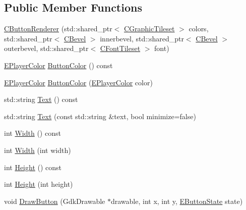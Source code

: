 \subsection*{Public Member Functions}
\begin{DoxyCompactItemize}
\item 
\hyperlink{classCButtonRenderer_a168e60a1e237820d58b4667003340aaf}{C\+Button\+Renderer} (std\+::shared\+\_\+ptr$<$ \hyperlink{classCGraphicTileset}{C\+Graphic\+Tileset} $>$ colors, std\+::shared\+\_\+ptr$<$ \hyperlink{classCBevel}{C\+Bevel} $>$ innerbevel, std\+::shared\+\_\+ptr$<$ \hyperlink{classCBevel}{C\+Bevel} $>$ outerbevel, std\+::shared\+\_\+ptr$<$ \hyperlink{classCFontTileset}{C\+Font\+Tileset} $>$ font)
\item 
\hyperlink{GameDataTypes_8h_aafb0ca75933357ff28a6d7efbdd7602f}{E\+Player\+Color} \hyperlink{classCButtonRenderer_a1b7adb2d7ced22c309cb497ea5e8d10c}{Button\+Color} () const
\item 
\hyperlink{GameDataTypes_8h_aafb0ca75933357ff28a6d7efbdd7602f}{E\+Player\+Color} \hyperlink{classCButtonRenderer_a76037d44fb1da753bcd1447a44dba51c}{Button\+Color} (\hyperlink{GameDataTypes_8h_aafb0ca75933357ff28a6d7efbdd7602f}{E\+Player\+Color} color)
\item 
std\+::string \hyperlink{classCButtonRenderer_ab0ff6bd90e3f7f7a9946c5c3198ed30c}{Text} () const
\item 
std\+::string \hyperlink{classCButtonRenderer_a565c9c19612bc2c7fb29a22f18b74d13}{Text} (const std\+::string \&text, bool minimize=false)
\item 
int \hyperlink{classCButtonRenderer_a9da3b741cb517d2386dd265ad494af54}{Width} () const
\item 
int \hyperlink{classCButtonRenderer_ace9959d559850f1b916e1a949f25e21f}{Width} (int width)
\item 
int \hyperlink{classCButtonRenderer_aecdea7c8978a3d0fb27f3a7bf49d8387}{Height} () const
\item 
int \hyperlink{classCButtonRenderer_addba56a5d490f33010c919020e67a376}{Height} (int height)
\item 
void \hyperlink{classCButtonRenderer_a9f29dd6d2243ddae58211706cc6b37b6}{Draw\+Button} (Gdk\+Drawable $\ast$drawable, int x, int y, \hyperlink{classCButtonRenderer_ae0eccda184600f6e14bfd59033e5e9a1}{E\+Button\+State} state)
\end{DoxyCompactItemize}
